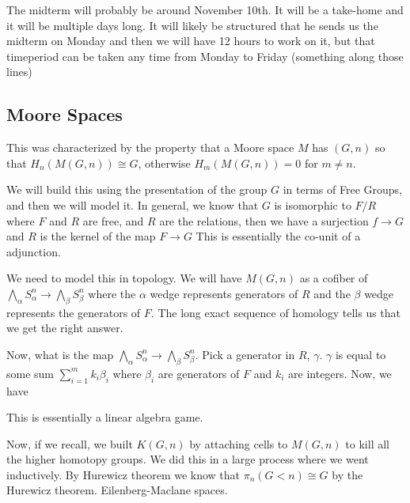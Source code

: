 \documentclass[12pt]{article}
\theoremstyle{definition}
\begin{document}
	The midterm will probably be around November 10th. It will be a take-home and it will be multiple days long. It will likely be structured that he sends us the midterm on Monday and then we will have 12 hours to work on it, but that timeperiod can be taken any time from Monday to Friday (something along those lines) 
	\subsection{Moore Spaces}
	This was characterized by the property that  a Moore space $M$ has $(G,n)$ so that $H_n(M(G,n))\cong G$, otherwise $H_m(M(G,n))=0$ for $m\neq n$.
	
	We will build this using the presentation of the group $G$ in terms of Free Groups, and then we will model it. 
	In general, we know that $G$ is isomorphic to $F/R$ where $F$ and $R$ are free, and $R$ are the relations, then we have a surjection $f\to G$ and $R$ is the kernel of the map $F\to G$ This is essentially the co-unit of a adjunction. 
	
	We need to model this in topology. We will have $M(G,n)$ as a cofiber of $\bigwedge_\alpha S_\alpha^n\to \bigwedge_\beta S_\beta^n$ where the $\alpha$ wedge represents generators of $R$ and the $\beta$ wedge represents the generators of $F$. The long exact sequence of homology tells us that we get the right answer. 
	
	Now, what is the map $\bigwedge_\alpha S_\alpha^n\to \bigwedge_\beta S_\beta^n$. Pick a generator in $R$, $\gamma$. $\gamma$ is equal to some sum $\sum_{i=1}^m k_i\beta_i$ where $\beta_i$ are generators of $F$ and $k_i$ are integers. Now, we have \begin{center}
	\end{center}
	
	This is essentially a linear algebra game.
	
	Now, if we recall, we built $K(G,n)$ by attaching cells to $M(G,n)$ to kill all the higher homotopy groups. We did this in a large process where we went inductively. By Hurewicz theorem we know that $\pi_n(G<n)\cong G$ by the Hurewicz theorem. Eilenberg-Maclane spaces. 
	
\end{document}
